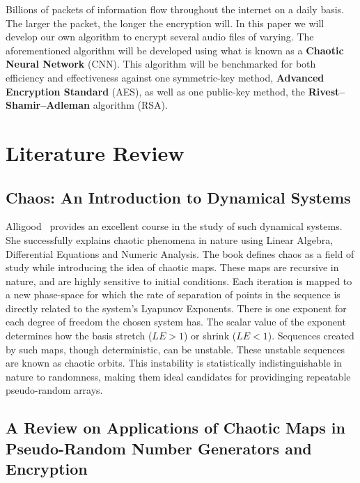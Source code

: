 \documentclass[conference]{IEEEtran}
\begin{document}
Billions of packets of information flow throughout the internet on a daily basis.
The larger the packet, the longer the encryption will.
In this paper we will develop our own algorithm to encrypt several audio files of varying.
The aforementioned algorithm will be developed using what is known as a \textbf{Chaotic Neural Network} (CNN).
This algorithm will be benchmarked for both efficiency and effectiveness against one symmetric-key method, \textbf{Advanced Encryption Standard} (AES), as well as one public-key method, the \textbf{Rivest–Shamir–Adleman} algorithm (RSA).

\section{Literature Review}\label{sec:literature-review}

\subsection{\textbf{Chaos: An Introduction to Dynamical Systems}}\label{subsec:chaos:-an-introduction-to-dynamical-systems}

Alligood~\cite{Alligood} provides an excellent course in the study of such dynamical systems.
She successfully explains chaotic phenomena in nature using Linear Algebra, Differential Equations and Numeric Analysis.
The book defines chaos as a field of study while introducing the idea of chaotic maps.
These maps are recursive in nature, and are highly sensitive to initial conditions.
Each iteration is mapped to a new phase-space for which the rate of separation of points in the sequence is directly related to the system's Lyapunov Exponents.
There is one exponent for each degree of freedom the chosen system has.
The scalar value of the exponent determines how the basis stretch ($LE > 1$) or shrink ($LE < 1$).
Sequences created by such maps, though deterministic, can be unstable.
These unstable sequences are known as chaotic orbits.
This instability is statistically indistinguishable in nature to randomness, making them ideal candidates for providinging repeatable pseudo-random arrays.

\subsection{\textbf{A Review on Applications of Chaotic Maps in Pseudo-Random Number Generators and Encryption}}\label{subsec:a-review-on-applications-of-chaotic-maps-in-pseudo-random-number-generators-and-encryption}
\end{document}
